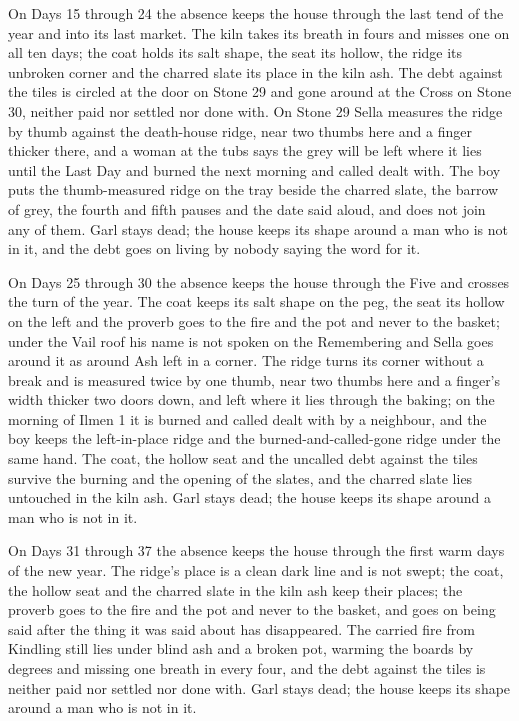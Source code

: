 \documentclass{design/chronicle}
\begin{document}
{On Days 15 through 24 the absence keeps the house through the last tend of the year and into its last market. The kiln takes its breath in fours and misses one on all ten days; the coat holds its salt shape, the seat its hollow, the ridge its unbroken corner and the charred slate its place in the kiln ash. The debt against the tiles is circled at the door on Stone 29 and gone around at the Cross on Stone 30, neither paid nor settled nor done with. On Stone 29 Sella measures the ridge by thumb against the death-house ridge, near two thumbs here and a finger thicker there, and a woman at the tubs says the grey will be left where it lies until the Last Day and burned the next morning and called dealt with. The boy puts the thumb-measured ridge on the tray beside the charred slate, the barrow of grey, the fourth and fifth pauses and the date said aloud, and does not join any of them. Garl stays dead; the house keeps its shape around a man who is not in it, and the debt goes on living by nobody saying the word for it.

On Days 25 through 30 the absence keeps the house through the Five and crosses the turn of the year. The coat keeps its salt shape on the peg, the seat its hollow on the left and the proverb goes to the fire and the pot and never to the basket; under the Vail roof his name is not spoken on the Remembering and Sella goes around it as around Ash left in a corner. The ridge turns its corner without a break and is measured twice by one thumb, near two thumbs here and a finger’s width thicker two doors down, and left where it lies through the baking; on the morning of Ilmen 1 it is burned and called dealt with by a neighbour, and the boy keeps the left-in-place ridge and the burned-and-called-gone ridge under the same hand. The coat, the hollow seat and the uncalled debt against the tiles survive the burning and the opening of the slates, and the charred slate lies untouched in the kiln ash. Garl stays dead; the house keeps its shape around a man who is not in it.

On Days 31 through 37 the absence keeps the house through the first warm days of the new year. The ridge’s place is a clean dark line and is not swept; the coat, the hollow seat and the charred slate in the kiln ash keep their places; the proverb goes to the fire and the pot and never to the basket, and goes on being said after the thing it was said about has disappeared. The carried fire from Kindling still lies under blind ash and a broken pot, warming the boards by degrees and missing one breath in every four, and the debt against the tiles is neither paid nor settled nor done with. Garl stays dead; the house keeps its shape around a man who is not in it.

}
\end{document}
